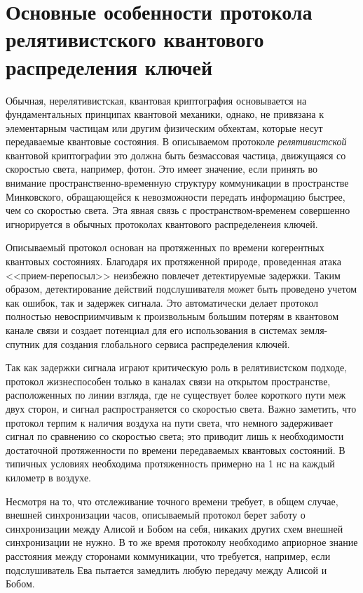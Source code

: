 \section[Основные особенности протокола]{Основные особенности протокола релятивистского квантового распределения ключей}
Обычная, нерелятивистская, квантовая криптография основывается на фундаментальных принципах квантовой механики, однако, не привязана к элементарным частицам или другим физическим обхектам, которые несут передаваемые квантовые состояния. В описываемом протоколе \textit{релятивистской} квантовой криптографии это должна быть безмассовая частица, движущаяся со скоростью света, например, фотон. 
Это имеет значение, если принять во внимание пространственно-временную структуру коммуникации в пространстве Минковского, обращающейся к невозможности передать информацию быстрее, чем со скоростью света.
Эта явная связь с пространством-временем совершенно игнорируется в обычных протоколах квантового распределенеия ключей.

Описываемый протокол основан на протяженных по времени когерентных квантовых состояниях. Благодаря их протяженной природе, проведенная атака <<прием-перепосыл>> неизбежно повлечет детектируемые задержки.
Таким образом, детектирование действий подслушивателя может быть проведено учетом как ошибок, так и задержек сигнала. 
Это автоматически делает протокол полностью невосприимчивым к произвольным большим потерям в квантовом канале связи и создает потенциал для его использования в системах земля-спутник для создания глобального сервиса распределения ключей.

Так как задержки сигнала играют критическую роль в релятивистском подходе, протокол жизнеспособен только в каналах связи на открытом пространстве, расположенных по линии взгляда, где не существует более короткого пути меж двух сторон, и сигнал распространяется со скоростью света. 
Важно заметить, что протокол терпим к наличия воздуха на пути света, что немного задерживает сигнал по сравнению со скоростью света; это приводит лишь к необходимости достаточной протяженности по времени передаваемых квантовых состояний. 
В типичных условиях необходима протяженность примерно на 1 нс на каждый километр в воздухе.

Несмотря на то, что отслеживание точного времени требует, в общем случае, внешней синхронизации часов, описываемый протокол берет заботу о синхронизации между Алисой и Бобом на себя, никаких других схем внешней синхронизации не нужно. 
В то же время протоколу необходимо априорное знание расстояния между сторонами коммуникации, что требуется, например, если подслушиватель Ева пытается замедлить любую передачу между Алисой и Бобом.

